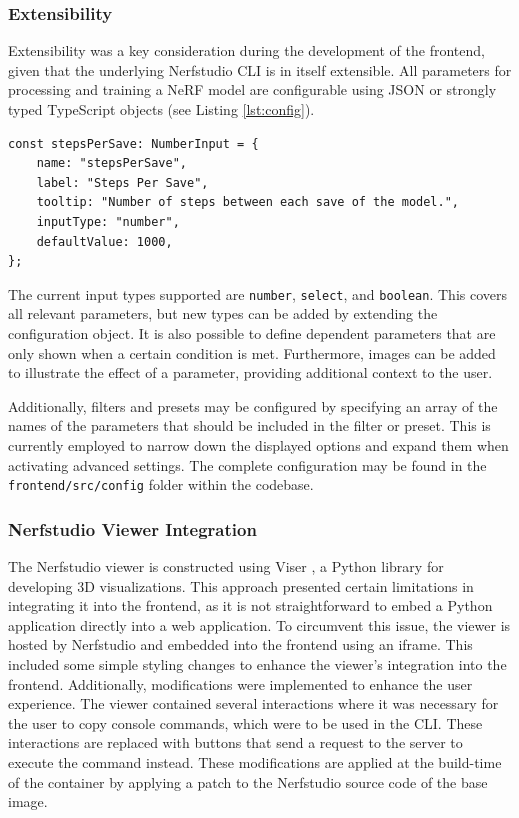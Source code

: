 \subsubsection{Extensibility}

Extensibility was a key consideration during the development of the frontend, given that the underlying Nerfstudio CLI is in itself extensible.
All parameters for processing and training a NeRF model are configurable using JSON or strongly typed TypeScript objects (see Listing \ref{lst:config}).

\begin{lstlisting}[style=ES6, caption=Minimal parameter configuration for 'Steps Per Save' input., label=lst:config]
const stepsPerSave: NumberInput = {
	name: "stepsPerSave",
	label: "Steps Per Save",
	tooltip: "Number of steps between each save of the model.",
	inputType: "number",
	defaultValue: 1000,
};
\end{lstlisting}

The current input types supported are \texttt{number}, \texttt{select}, and \texttt{boolean}. 
This covers all relevant parameters, but new types can be added by extending the configuration object. 
It is also possible to define dependent parameters that are only shown when a certain condition is met. 
Furthermore, images can be added to illustrate the effect of a parameter, providing additional context to the user.

Additionally, filters and presets may be configured by specifying an array of the names of the parameters that should be included in the filter or preset.
This is currently employed to narrow down the displayed options and expand them when activating advanced settings. 
The complete configuration may be found in the \texttt{frontend/src/config} folder within the codebase.

\subsubsection{Nerfstudio Viewer Integration}

The Nerfstudio viewer is constructed using Viser \cite{noauthor_nerfstudio-projectviser_2024}, a Python library for developing 3D visualizations.
This approach presented certain limitations in integrating it into the frontend, as it is not straightforward to embed a Python application directly into a web application.
To circumvent this issue, the viewer is hosted by Nerfstudio and embedded into the frontend using an iframe.
This included some simple styling changes to enhance the viewer's integration into the frontend.
Additionally, modifications were implemented to enhance the user experience.
The viewer contained several interactions where it was necessary for the user to copy console commands, which were to be used in the CLI.
These interactions are replaced with buttons that send a request to the server to execute the command instead. 
These modifications are applied at the build-time of the container by applying a patch to the Nerfstudio source code of the base image.

